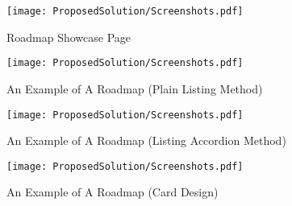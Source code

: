 \begin{figure}[H]
    \centering
    \begin{minipage}{0.45\textwidth}
        \centering
        \texttt{[image: ProposedSolution/Screenshots.pdf]} 
        \caption{Roadmap Showcase Page}
    \end{minipage}\hfill
    \begin{minipage}{0.45\textwidth}
        \centering
        \texttt{[image: ProposedSolution/Screenshots.pdf]} 
        \caption{An Example of A Roadmap (Plain Listing Method)}
    \end{minipage}
    \centering
    \begin{minipage}{0.45\textwidth}
        \centering
        \texttt{[image: ProposedSolution/Screenshots.pdf]} 
        \caption{An Example of A Roadmap (Listing Accordion Method)}
    \end{minipage}\hfill
    \begin{minipage}{0.45\textwidth}
        \centering
        \texttt{[image: ProposedSolution/Screenshots.pdf]} 
        \caption{An Example of A Roadmap (Card Design)}
    \end{minipage}
\end{figure}

